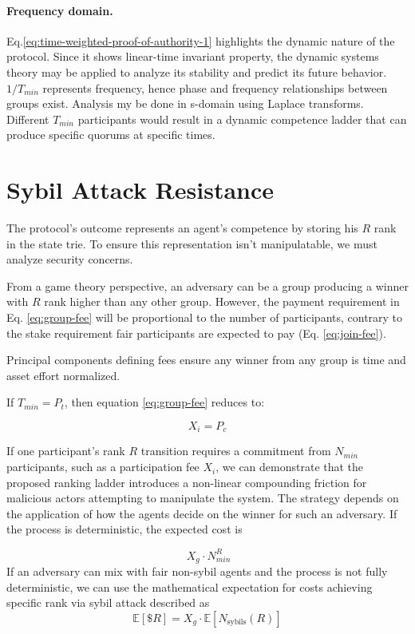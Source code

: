 \documentclass{article}
\begin{document}
\begin{CJK}{UTF8}{gbsn}
    \paragraph*{Frequency domain.} Eq.\ref{eq:time-weighted-proof-of-authority-1} highlights the dynamic nature of the protocol. Since it shows linear-time invariant property, the dynamic systems theory\cite{Lynn86} may be applied to analyze its stability and predict its future behavior.
    $1/T_{min}$ represents frequency, hence phase and frequency relationships between groups exist. Analysis my be done in s-domain using Laplace transforms. Different ${T_{min}}$ participants would result in a dynamic competence ladder that can produce specific quorums at specific times.

    \section{Sybil Attack Resistance}

    The protocol’s outcome represents an agent’s competence by storing his $R$ rank in the state trie. To ensure this representation isn’t manipulatable, we must analyze security concerns.

    From a game theory perspective, an adversary can be a group producing a winner with $R$ rank higher than any other group. However, the payment requirement in Eq. \ref{eq:group-fee} will be proportional to the number of participants, contrary to the stake requirement fair participants are expected to pay (Eq. \ref{eq:join-fee}).

    Principal components defining fees ensure any winner from any group is time and asset effort normalized.

    If $T_{min} = P_t$, then equation \ref{eq:group-fee} reduces to:

    \begin{equation}
        \label{eq:join-fee-2}
        X_i = P_c
    \end{equation}

    If one participant's rank $R$ transition requires a commitment from $N_{min}$ participants, such as a participation fee $X_i$, we can demonstrate that the proposed ranking ladder introduces a non-linear compounding friction for malicious actors attempting to manipulate the system. The strategy depends on the application of how the agents decide on the winner for such an adversary. If the process is deterministic, the expected cost is

    \begin{equation}\
        \label{eq:direct-sybil-cost}
        X_g \cdot N_{min}^R
    \end{equation}
    If an adversary can mix with fair non-sybil agents and the process is not fully deterministic, we can use the mathematical expectation for costs achieving specific rank via sybil attack described as
    \begin{equation}
        \mathbb{E}[\$R] = X_g \cdot \mathbb{E}[N_{\text{sybils}}(R)]
    \end{equation}


\end{CJK}
\end{document}
